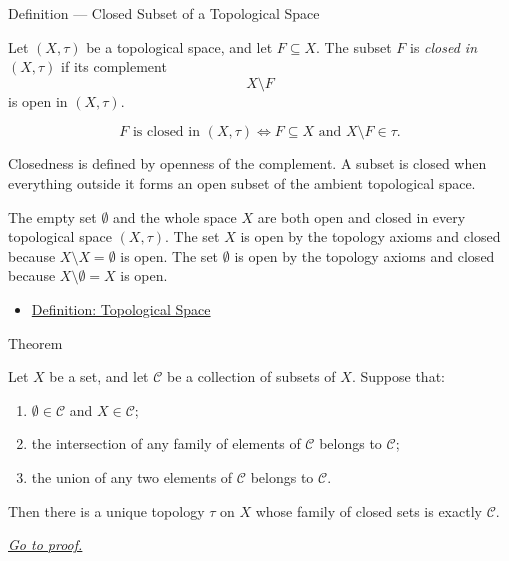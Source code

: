 \begin{definitionbox}{Definition --- Closed Subset of a Topological Space}
\begin{definition}
\label{def:topological-closed-subset}
Let \((X,\tau)\) be a topological space, and let \(F\subseteq X\).  The subset
\(F\) is \emph{closed in \((X,\tau)\)} if its complement
\[
  X\setminus F
\]
is open in \((X,\tau)\).
\end{definition}
\end{definitionbox}

\begin{remark*}
\[
F\text{ is closed in }(X,\tau)
\Longleftrightarrow
F\subseteq X
\text{ and }
X\setminus F\in\tau.
\]
\end{remark*}

\begin{remark*}[Interpretation]
Closedness is defined by openness of the complement.  A subset is closed when
everything outside it forms an open subset of the ambient topological space.
\end{remark*}

\begin{remark*}[Examples]
The empty set \(\emptyset\) and the whole space \(X\) are both open and
closed in every topological space \((X,\tau)\).  The set \(X\) is open by the
topology axioms and closed because \(X\setminus X=\emptyset\) is open.  The
set \(\emptyset\) is open by the topology axioms and closed because
\(X\setminus\emptyset=X\) is open.
\end{remark*}

\begin{dependencies}
\begin{itemize}
  \item \hyperref[def:topological-space]{Definition: Topological Space}
\end{itemize}
\end{dependencies}

\begin{theorembox}{Theorem}
\begin{theorem}
\label{thm:closed-set-characterization-topologies}
Let \(X\) be a set, and let \(\mathcal{C}\) be a collection of subsets of
\(X\).  Suppose that:
\begin{enumerate}
  \item \(\emptyset\in\mathcal{C}\) and \(X\in\mathcal{C}\);
  \item the intersection of any family of elements of \(\mathcal{C}\) belongs
        to \(\mathcal{C}\);
  \item the union of any two elements of \(\mathcal{C}\) belongs to
        \(\mathcal{C}\).
\end{enumerate}
Then there is a unique topology \(\tau\) on \(X\) whose family of closed sets
is exactly \(\mathcal{C}\).

\smallskip
\noindent
\hyperref[prf:closed-set-characterization-topologies]{\textit{Go to proof.}}
\end{theorem}
\end{theorembox}

